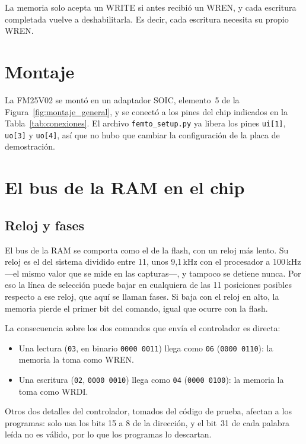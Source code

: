 \documentclass[11pt,letterpaper,oneside]{report}
\newcommand{\code}[1]{\texttt{#1}}
\begin{document}
La memoria solo acepta un WRITE si antes recibió un WREN, y cada escritura completada vuelve a deshabilitarla. Es decir, cada escritura necesita su propio WREN.

\section{Montaje}

La FM25V02 se montó en un adaptador SOIC, elemento~5 de la Figura~\ref{fig:montaje_general}, y se conectó a los pines del chip indicados en la Tabla~\ref{tab:conexiones}. El archivo \code{femto\_setup.py} ya libera los pines \code{ui[1]}, \code{uo[3]} y \code{uo[4]}, así que no hubo que cambiar la configuración de la placa de demostración.

\section{El bus de la RAM en el chip}

\subsection{Reloj y fases}

El bus de la RAM se comporta como el de la flash, con un reloj más lento. Su reloj es el del sistema dividido entre 11, unos 9,1\,kHz con el procesador a 100\,kHz ---el mismo valor que se mide en las capturas---, y tampoco se detiene nunca. Por eso la línea de selección puede bajar en cualquiera de las 11 posiciones posibles respecto a ese reloj, que aquí se llaman fases. Si baja con el reloj en alto, la memoria pierde el primer bit del comando, igual que ocurre con la flash.

La consecuencia sobre los dos comandos que envía el controlador es directa:

\begin{itemize}
  \item Una lectura (\code{03}, en binario \code{0000 0011}) llega como \code{06} (\code{0000 0110}): la memoria la toma como WREN.
  \item Una escritura (\code{02}, \code{0000 0010}) llega como \code{04} (\code{0000 0100}): la memoria la toma como WRDI.
\end{itemize}

Otros dos detalles del controlador, tomados del código de prueba, afectan a los programas: solo usa los bits 15 a 8 de la dirección, y el bit~31 de cada palabra leída no es válido, por lo que los programas lo descartan.
\end{document}
